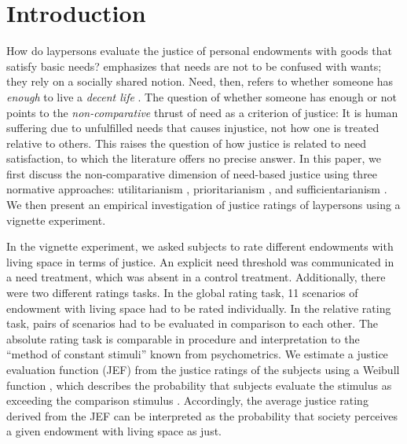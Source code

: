 \documentclass[12pt]{scrartcl}
\begin{document}
\section{Introduction}\label{sec:introduction}
How do laypersons evaluate the justice of personal endowments with goods that satisfy basic needs?
\cite{miller_principles_1999} emphasizes that needs are not to be confused with wants; they rely on a socially shared notion.
Need, then, refers to whether someone has \textit{enough} \citep{frankfurt_inequality_2015} to live a \textit{decent life} \citep{miller_principles_1999}.
The question of whether someone has enough or not points to the \textit{non-comparative} \citep{feinberg_noncomparative_1974} thrust of need as a criterion of justice: It is human suffering due to unfulfilled needs that causes injustice, not how one is treated relative to others.
This raises the question of how justice is related to need satisfaction, to which the literature offers no precise answer.
In this paper, we first discuss the non-comparative dimension of need-based justice using three normative approaches: utilitarianism \citep[e.\,g.,][]{bentham_introduction_2009,mill_utilitarianism_1998}, prioritarianism \citep[e.\,g.,][]{parfit_equality_1997}, and sufficientarianism \citep[e.\,g.,][]{frankfurt_equality_1987,crisp_egalitarianism_2003,schramme_is_2006}.
We then present an empirical investigation of justice ratings of laypersons using a vignette experiment.

In the vignette experiment, we asked subjects to rate different endowments with living space in terms of justice.
An explicit need threshold was communicated in a need treatment, which was absent in a control treatment.
Additionally, there were two different ratings tasks.
In the global rating task, 11 scenarios of endowment with living space had to be rated individually.
In the relative rating task, pairs of scenarios had to be evaluated in comparison to each other.
The absolute rating task is comparable in procedure and interpretation to the ``method of constant stimuli'' known from psychometrics.
We estimate a justice evaluation function (JEF) from the justice ratings of the subjects using a Weibull function \citep{wichmann_psychometric_2001,mortensen_additive_2002}, which describes the probability that subjects evaluate the stimulus as exceeding the comparison stimulus \citep[p.~2503]{treutwein_adaptive_1995}.
Accordingly, the average justice rating derived from the JEF can be interpreted as the probability that society perceives a given endowment with living space as just.
\end{document}
